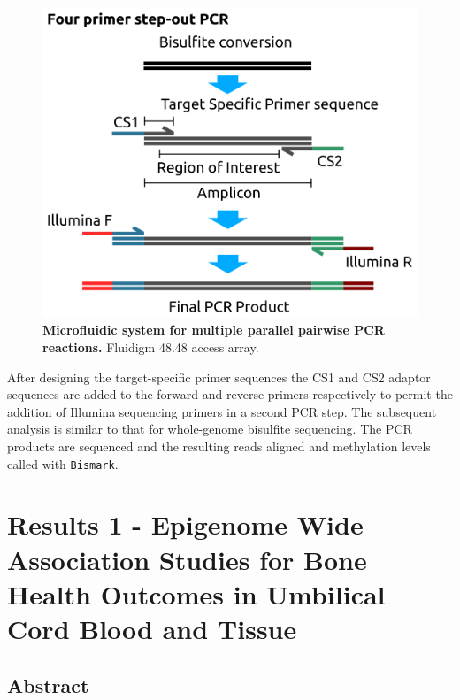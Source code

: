\documentclass[
]{book}
\begin{document}
\begin{figure}

{\centering \includegraphics[width=0.6\linewidth]{figs/targeted_BiSseq_fluidigm_PCR} 

}

\caption{\textbf{Microfluidic system for multiple parallel pairwise PCR reactions.}
Fluidigm 48.48 access array.}\label{fig:targetedBiSseqFluidigmPCR}
\end{figure}




After designing the target-specific primer sequences the CS1 and CS2 adaptor sequences are added to the forward and reverse primers respectively to permit the addition of Illumina sequencing primers in a second PCR step.
The subsequent analysis is similar to that for whole-genome bisulfite sequencing.
The PCR products are sequenced and the resulting reads aligned and methylation levels called with \texttt{Bismark}.

\hypertarget{arrays}{%
\chapter{Results 1 - Epigenome Wide Association Studies for Bone Health Outcomes in Umbilical Cord Blood and Tissue}\label{arrays}}

\hypertarget{abstract-1}{%
\section{Abstract}\label{abstract-1}}
\end{document}
